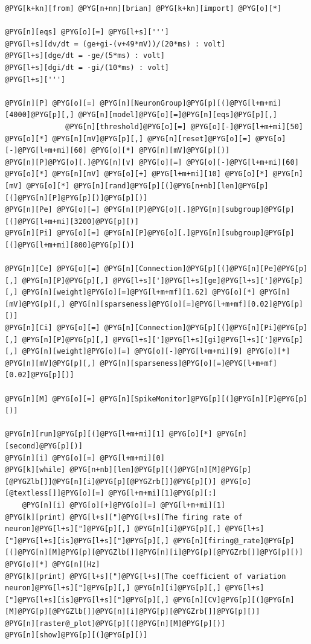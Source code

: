 \documentclass[letterpaper,10pt,english]{manual}
\begin{document}
\begin{Verbatim}[commandchars=@\[\]]
@PYG[k+kn][from] @PYG[n+nn][brian] @PYG[k+kn][import] @PYG[o][*]

@PYG[n][eqs] @PYG[o][=] @PYG[l+s][''']
@PYG[l+s][dv/dt = (ge+gi-(v+49*mV))/(20*ms) : volt]
@PYG[l+s][dge/dt = -ge/(5*ms) : volt]
@PYG[l+s][dgi/dt = -gi/(10*ms) : volt]
@PYG[l+s][''']

@PYG[n][P] @PYG[o][=] @PYG[n][NeuronGroup]@PYG[p][(]@PYG[l+m+mi][4000]@PYG[p][,] @PYG[n][model]@PYG[o][=]@PYG[n][eqs]@PYG[p][,]
              @PYG[n][threshold]@PYG[o][=] @PYG[o][-]@PYG[l+m+mi][50] @PYG[o][*] @PYG[n][mV]@PYG[p][,] @PYG[n][reset]@PYG[o][=] @PYG[o][-]@PYG[l+m+mi][60] @PYG[o][*] @PYG[n][mV]@PYG[p][)]
@PYG[n][P]@PYG[o][.]@PYG[n][v] @PYG[o][=] @PYG[o][-]@PYG[l+m+mi][60] @PYG[o][*] @PYG[n][mV] @PYG[o][+] @PYG[l+m+mi][10] @PYG[o][*] @PYG[n][mV] @PYG[o][*] @PYG[n][rand]@PYG[p][(]@PYG[n+nb][len]@PYG[p][(]@PYG[n][P]@PYG[p][)]@PYG[p][)]
@PYG[n][Pe] @PYG[o][=] @PYG[n][P]@PYG[o][.]@PYG[n][subgroup]@PYG[p][(]@PYG[l+m+mi][3200]@PYG[p][)]
@PYG[n][Pi] @PYG[o][=] @PYG[n][P]@PYG[o][.]@PYG[n][subgroup]@PYG[p][(]@PYG[l+m+mi][800]@PYG[p][)]

@PYG[n][Ce] @PYG[o][=] @PYG[n][Connection]@PYG[p][(]@PYG[n][Pe]@PYG[p][,] @PYG[n][P]@PYG[p][,] @PYG[l+s][']@PYG[l+s][ge]@PYG[l+s][']@PYG[p][,] @PYG[n][weight]@PYG[o][=]@PYG[l+m+mf][1.62] @PYG[o][*] @PYG[n][mV]@PYG[p][,] @PYG[n][sparseness]@PYG[o][=]@PYG[l+m+mf][0.02]@PYG[p][)]
@PYG[n][Ci] @PYG[o][=] @PYG[n][Connection]@PYG[p][(]@PYG[n][Pi]@PYG[p][,] @PYG[n][P]@PYG[p][,] @PYG[l+s][']@PYG[l+s][gi]@PYG[l+s][']@PYG[p][,] @PYG[n][weight]@PYG[o][=] @PYG[o][-]@PYG[l+m+mi][9] @PYG[o][*] @PYG[n][mV]@PYG[p][,] @PYG[n][sparseness]@PYG[o][=]@PYG[l+m+mf][0.02]@PYG[p][)]

@PYG[n][M] @PYG[o][=] @PYG[n][SpikeMonitor]@PYG[p][(]@PYG[n][P]@PYG[p][)]

@PYG[n][run]@PYG[p][(]@PYG[l+m+mi][1] @PYG[o][*] @PYG[n][second]@PYG[p][)]
@PYG[n][i] @PYG[o][=] @PYG[l+m+mi][0]
@PYG[k][while] @PYG[n+nb][len]@PYG[p][(]@PYG[n][M]@PYG[p][@PYGZlb[]]@PYG[n][i]@PYG[p][@PYGZrb[]]@PYG[p][)] @PYG[o][@textless[]]@PYG[o][=] @PYG[l+m+mi][1]@PYG[p][:]
    @PYG[n][i] @PYG[o][+]@PYG[o][=] @PYG[l+m+mi][1]
@PYG[k][print] @PYG[l+s]["]@PYG[l+s][The firing rate of neuron]@PYG[l+s]["]@PYG[p][,] @PYG[n][i]@PYG[p][,] @PYG[l+s]["]@PYG[l+s][is]@PYG[l+s]["]@PYG[p][,] @PYG[n][firing@_rate]@PYG[p][(]@PYG[n][M]@PYG[p][@PYGZlb[]]@PYG[n][i]@PYG[p][@PYGZrb[]]@PYG[p][)] @PYG[o][*] @PYG[n][Hz]
@PYG[k][print] @PYG[l+s]["]@PYG[l+s][The coefficient of variation neuron]@PYG[l+s]["]@PYG[p][,] @PYG[n][i]@PYG[p][,] @PYG[l+s]["]@PYG[l+s][is]@PYG[l+s]["]@PYG[p][,] @PYG[n][CV]@PYG[p][(]@PYG[n][M]@PYG[p][@PYGZlb[]]@PYG[n][i]@PYG[p][@PYGZrb[]]@PYG[p][)]
@PYG[n][raster@_plot]@PYG[p][(]@PYG[n][M]@PYG[p][)]
@PYG[n][show]@PYG[p][(]@PYG[p][)]
\end{Verbatim}
\end{document}
